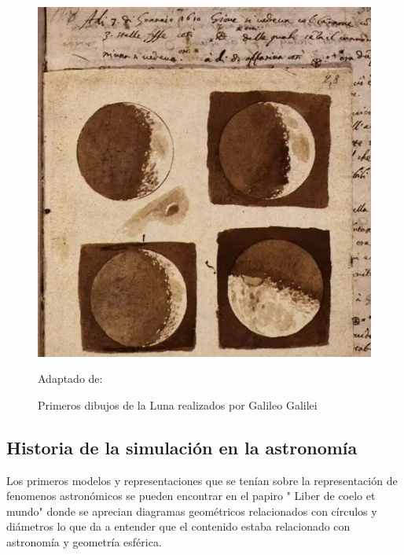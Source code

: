 \begin{figure}[h]
    \includegraphics[scale = 0.5]{Imagenes/GalileoMoon.png}
    \centering
    \caption{Primeros dibujos de la Luna realizados por Galileo Galilei}{ Adaptado de: \cite{bbc}}

\end{figure}

\subsection{Historia de la simulación en la astronomía}

Los primeros modelos y representaciones que se tenían sobre la representación 
de fenomenos astronómicos se pueden encontrar en el papiro " Liber de coelo et mundo"
donde se aprecian diagramas geométricos relacionados con círculos y diámetros lo que da a entender
que el contenido estaba relacionado con astronomía y geometría esférica.


